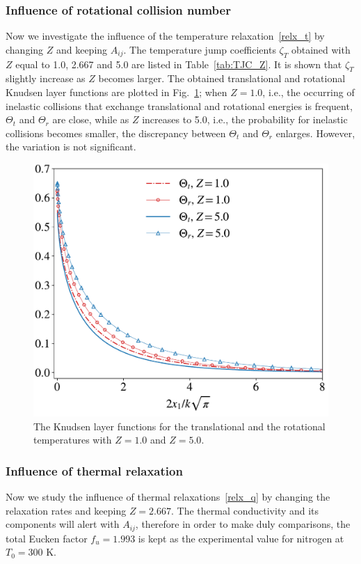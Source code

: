 \subsubsection{Influence of rotational collision number}

Now we investigate the influence of the temperature relaxation~\eqref{relx_t} by changing $Z$ and keeping $A_{ij}$. The temperature jump coefficients $\zeta_T$ obtained with $Z$ equal to 1.0, 2.667 and 5.0 are listed in Table~\ref{tab:TJC_Z}. It is shown that $\zeta_T$ slightly increase as $Z$ becomes larger. The obtained translational and rotational Knudsen layer functions are plotted in Fig.~\ref{fig:KLF_Z}; when $Z=1.0$, i.e., the occurring of inelastic collisions that exchange translational and rotational energies is frequent, $\Theta_t$ and $\Theta_r$ are close, while as $Z$ increases to 5.0, i.e., the probability for inelastic collisions becomes smaller, the discrepancy between $\Theta_t$ and $\Theta_r$ enlarges. However, the variation is not significant.



\begin{figure}[t]
	\centering
	\includegraphics[width=0.5\columnwidth]{SlipJump/IMG/KLF_Z}%
	\caption{The Knudsen layer functions for the translational and the rotational temperatures with $Z=1.0$ and $Z=5.0$. }
	\label{fig:KLF_Z}
\end{figure}


\subsubsection{Influence of thermal relaxation}

Now we study the influence of thermal relaxations~\eqref{relx_q} by changing the relaxation rates and keeping $Z=2.667$. The thermal conductivity and its components will alert with $A_{ij}$, therefore in order to make duly comparisons, the total Eucken factor $f_{u}=1.993$ is kept as the experimental value for nitrogen at $T_0=300$ K. 

